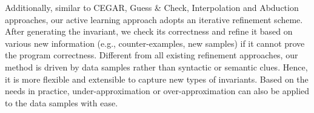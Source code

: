 Additionally, similar to CEGAR, Guess \& Check, Interpolation and Abduction approaches, 
our active learning approach adopts an iterative refinement scheme. 
After generating the invariant, we check its correctness and refine it 
based on various new information (e.g., counter-examples, new samples) 
if it cannot prove the program correctness. 
Different from all existing refinement approaches, 
our method is driven by data samples rather than syntactic or semantic clues. 
Hence, it is more flexible and extensible to capture new types of invariants. 
Based on the needs in practice, under-approximation or over-approximation 
can also be applied to the data samples with ease. 

